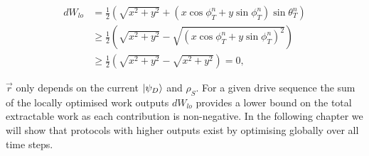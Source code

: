 \begin{align*}
dW_{lo} &= \frac{1}{2}\left(\sqrt{x^2 + y^2} + (x \cos\phi^n_T + y \sin\phi_T^n) \sin\theta_T^n \right) \\
&\geq \frac{1}{2}\left( \sqrt{x^2 + y^2} - \sqrt{(x \cos\phi^n_T + y \sin\phi_T^n)^2} \right) \\
&\geq \frac{1}{2}\left(\sqrt{x^2 + y^2} - \sqrt{x^2 + y^2} \right) = 0,
\end{align*}

$\vec{r}$ only depends on the current $\ket{\psi_D}$ and $\rho_S$.
For a given drive sequence the sum of the locally optimised work outputs $dW_{lo}$ provides a lower bound on the total extractable work as each contribution is non-negative. In the following chapter we will show that protocols with higher outputs exist by optimising globally over all time steps.